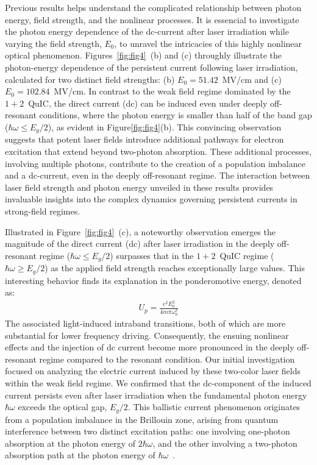  Previous results helps understand the complicated relationship between photon energy, field strength, and the nonlinear processes. It is essencial to investigate the photon energy dependence of the dc-current after laser irradiation while varying the field strength, $E_0$, to unravel the intricacies of this highly nonlinear optical phenomenon. 
 Figures~\ref{fig:fig4}~(b) and (c) throughly illustrate the photon-energy dependence of the persistent current following laser irradiation, calculated for two distinct field strengths: (b) $E_0=51.42$~MV/cm and (c) $E_0=102.84$~MV/cm. In contrast to the weak field regime dominated by the $1+2$~\gls{QuIC}, the direct current (dc) can be induced even under deeply off-resonant conditions, where the photon energy is smaller than half of the band gap ($\hbar \omega \le E_g/2$), as evident in Figure\ref{fig:fig4}(b). This convincing observation suggests that potent laser fields introduce additional pathways for electron excitation that extend beyond two-photon absorption. These additional processes, involving multiple photons, contribute to the creation of a population imbalance and a dc-current, even in the deeply off-resonant regime. The interaction between laser field strength and photon energy unveiled in these results provides invaluable insights into the complex dynamics governing persistent currents in strong-field regimes.

 Illustrated in Figure~\ref{fig:fig4}~(c), a noteworthy observation emerges the magnitude of the direct current (dc) after laser irradiation in the deeply off-resonant regime ($\hbar \omega \le E_g/2$) surpasses that in the $1+2$~\gls{QuIC} regime ($\hbar \omega \ge E_g/2$) as the applied field strength reaches exceptionally large values. This interesting behavior finds its explanation in the ponderomotive energy, denoted as:
 \begin{align}
 U_p=\frac{e^2E^2_0}{4m\pi \omega_0^2}    
 \end{align}
 The associated light-induced intraband transitions, both of which are more substantial for lower frequency driving\cite{PhysRevB.98.035202}. Consequently, the ensuing nonlinear effects and the injection of dc current become more pronounced in the deeply off-resonant regime compared to the resonant condition. 
Our initial investigation focused on analyzing the electric current induced by these two-color laser fields within the weak field regime. We confirmed that the dc-component of the induced current persists even after laser irradiation when the fundamental photon energy $\hbar \omega$ exceeds the optical gap, $E_g/2$. This ballistic current phenomenon originates from a population imbalance in the Brillouin zone, arising from quantum interference between two distinct excitation paths: one involving one-photon absorption at the photon energy of $2\hbar \omega$, and the other involving a two-photon absorption path at the photon energy of $\hbar \omega$~\cite{PhysRevLett.74.3596,PhysRevLett.76.1703,PhysRevLett.78.306}.


